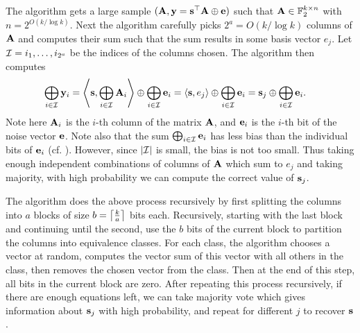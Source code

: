 The algorithm gets a large \LPN sample $({\mathbf A}, {\mathbf y} = {\mathbf s}^\top{\mathbf A} \oplus {\mathbf e})$ such that ${\mathbf A} \in {\mathbb F}_2^{k\times n}$ with $n = 2^{O(k/\log k)}$.
Next the algorithm carefully picks $2^a = O(k/\log k)$ columns of ${\mathbf A}$ and computes their sum such that the sum results in some basis vector $e_j$.
Let ${\mathcal I} = {i_1, \dotsc, i_{2^a}}$ be the indices of the columns chosen.
The algorithm then computes
\begin{align*}
	\bigoplus_{i \in {\mathcal I}} {\mathbf y}_i &= \left\langle{\ensuremath{{\mathbf s}}},{\bigoplus_{i \in {\mathcal I}} {\mathbf A}_i}\right\rangle\oplus \bigoplus_{i \in {\mathcal I}}{\mathbf e}_i=\left\langle{\ensuremath{{\mathbf s}}},{e_j}\right\rangle \oplus \bigoplus_{i \in {\mathcal I}}{\mathbf e}_i ={\mathbf s}_j \oplus \bigoplus_{i \in {\mathcal I}}{\mathbf e}_i.
\end{align*} 
Note here ${\mathbf A}_i$ is the $i$-th column of the matrix ${\mathbf A}$, and ${\mathbf e}_i$ is the $i$-th bit of the noise vector ${\mathbf e}$.
Note also that the sum $\bigoplus_{i \in {\mathcal I}}{\mathbf e}_i$ has less bias than the individual bits of ${\mathbf e}_i$ (cf. \cite[Lemma 4]{STOC:BluKalWas00}).
However, since $|{\mathcal I}|$ is small, the bias is not too small.
Thus taking enough independent combinations of columns of ${\mathbf A}$ which sum to $e_j$ and taking majority, with high probability we can compute the correct value of ${\mathbf s}_j$.

The algorithm does the above process recursively by first splitting the columns into $a$ blocks of size $b = \left\lceil{\frac{k}{a}}\right\rceil$ bits each.
Recursively, starting with the last block and continuing until the second, use the $b$ bits of the current block to partition the columns into equivalence classes.
For each class, the algorithm chooses a vector at random, computes the vector sum of this vector with all others in the class, then removes the chosen vector from the class.
Then at the end of this step, all bits in the current block are zero.
After repeating this process recursively, if there are enough equations left, we can take majority vote which gives information about ${\mathbf s}_j$ with high probability, and repeat for different $j$ to recover ${\mathbf s}$.

